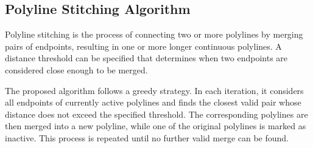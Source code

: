 \subsection{Polyline Stitching Algorithm}

Polyline stitching is the process of connecting two or more polylines by merging pairs of endpoints, resulting in one or more longer continuous polylines. A distance threshold can be specified that determines when two endpoints are considered close enough to be merged.

The proposed algorithm follows a greedy strategy. In each iteration, it considers all endpoints of currently active polylines and finds the closest valid pair whose distance does not exceed the specified threshold. The corresponding polylines are then merged into a new polyline, while one of the original polylines is marked as inactive. This process is repeated until no further valid merge can be found.


